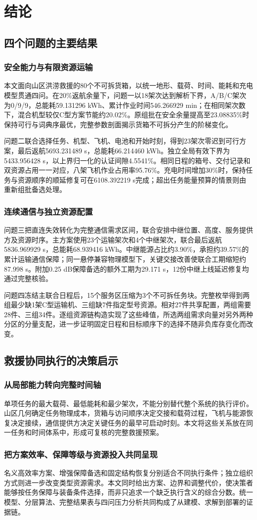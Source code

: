 \section{结论}
\label{sec:conclusion}
\subsection{四个问题的主要结果}
\subsubsection{安全能力与有限资源运输}
本文面向山区洪涝救援的80个不可拆货箱，以统一地形、载荷、时间、能耗和充电模型贯通四问。在20\%返航余量下，问题一以18架次达到解析下界，A/B/C架次为0/9/9，总能耗59.131296 kWh、累计作业时间546.266929 min；在相同架次数下，混合机型较仅C型方案节能约20.02\%。原组批在安全余量提高至23.08835\%时保持可行与词典序最优，完整参数剖面揭示货箱不可拆分产生的阶梯变化。

问题二联合选择任务、机型、飞机、电池和开始时刻，得到23架次零迟到可行方案，最后返航5693.231489 s，总能耗66.214460 kWh。独立全局有效下界为5433.956428 s，以上界归一化的认证间隙4.5541\%。相同日程的箱号、交付记录和双资源占用一一对应，八架飞机作业占用率95.76\%。充电时间增加30\%时，保持任务与资源顺序的顺延修复可在6108.392219 s完成；超出任务能量预算的情景则由重新组批备选处理。

\subsubsection{连续通信与独立资源配置}
问题三把直连失效转化为完整通信需求区间，联合安排中继位置、高度、服务提供方及资源时序。主方案使用23个运输架次和4个中继架次，联合最后返航5836.969929 s，总能耗68.939416 kWh。中继能源占比约3.90\%，承担约39.57\%的累计运输通信保障；同一悬停兼容物理模型下，关键交接改善使联合工期缩短约87.998 s。附加0.25 dB保障备选的额外工期为29.171 s，12份中继上线延迟修复均通过完整核验。

问题四冻结主联合日程后，15个服务区压缩为3个不可拆任务块。完整枚举得到两组最少缺1架C型运输机、三组缺7件指定型号资源。相对27件共享配置，两组需要28件、三组34件。逐组资源链构造实现了这些峰值，所选两组需求向量对另外两种分区的分量支配，进一步证明固定日程和目标顺序下的选择不随非负库存变化而改变。

\subsection{救援协同执行的决策启示}
\subsubsection{从局部能力转向完整时间轴}
单项任务的最大载荷、最低能耗和最少架次，不能分别替代整个系统的执行评价。山区几何确定任务物理成本，货箱与访问顺序决定交接和载荷过程，飞机与能源恢复决定接续，通信提供方决定关键任务的最早可启动时刻。本文将这些关系放在同一任务和时间体系中，形成可复核的完整救援预案。

\subsubsection{把方案效率、保障等级与资源投入共同呈现}
名义高效率方案、增强保障备选和固定结构恢复分别适合不同执行条件；独立组织方式则进一步改变类型资源需求。本文同时给出方案、边界和调整代价，使决策者能够按任务保障与装备条件选择，而非只追求一个缺乏执行含义的综合分数。统一模型、分层算法、完整结果表与四问压力分析共同构成了从建模、求解到部署的证据链。
